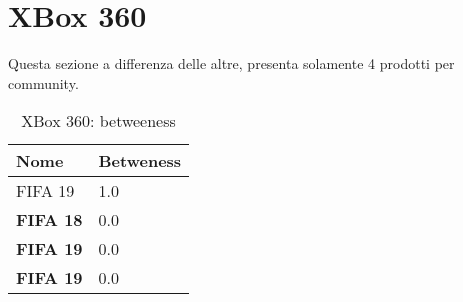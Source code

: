 \pagebreak

		\section{XBox 360}
			Questa sezione a differenza delle altre, presenta solamente 4 prodotti per community.
			\begin{table}[H]
				\caption{XBox 360: betweeness}
				\label{tab:xbox360}
				\centering
				\begin{tabular}{ll}
					\toprule 
					\textbf{Nome} & \textbf{Betweness} \\
					\midrule
					FIFA 19 & 1.0 \\
					\textbf{FIFA 18} & 0.0 \\
					\textbf{FIFA 19}  & 0.0 \\
					\textbf{FIFA 19} & 0.0 \\
					\bottomrule
				\end{tabular}
			\end{table}
		